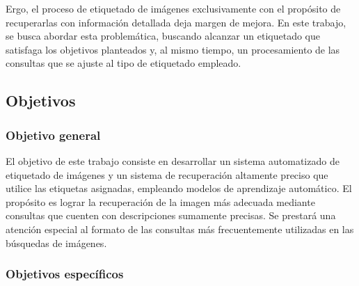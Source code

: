 Ergo, el proceso de etiquetado de im\'agenes exclusivamente con el prop\'osito de recuperarlas con informaci\'on detallada deja margen de mejora. En este trabajo, se busca abordar esta problem\'atica, buscando alcanzar un etiquetado que satisfaga los objetivos planteados y, al mismo tiempo, un procesamiento de las consultas que se ajuste al tipo de etiquetado empleado.
\subsection*{Objetivos}

\subsubsection* {Objetivo general}

El objetivo de este trabajo consiste en desarrollar un sistema automatizado de etiquetado de im\'agenes y un sistema de recuperaci\'on altamente preciso que utilice las etiquetas asignadas, empleando modelos de aprendizaje autom\'atico. El prop\'osito es lograr la recuperaci\'on de la imagen m\'as adecuada mediante consultas que cuenten con descripciones sumamente precisas. Se prestar\'a una atenci\'on especial al formato de las consultas m\'as frecuentemente utilizadas en las b\'usquedas de im\'agenes.

\subsubsection*{Objetivos espec\'ificos}

